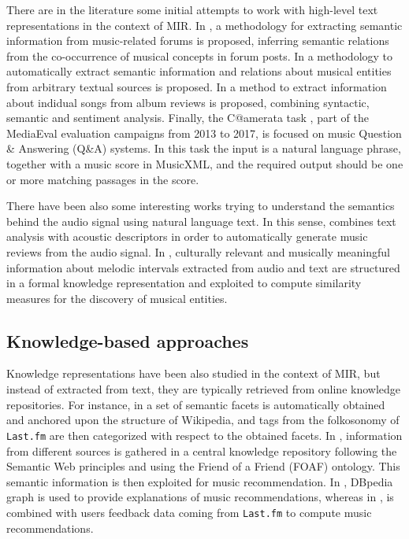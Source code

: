 There are in the literature some initial attempts to work with high-level text representations in the context of MIR. In \cite{Sordo2012}, a methodology for extracting semantic information from music-related forums is proposed, inferring semantic relations from the co-occurrence of musical concepts in forum posts. 
In \cite{Knees2011} a methodology to automatically extract semantic information and relations about musical entities from arbitrary textual sources is proposed. In \cite{TataandDiEugenio2010} a method to extract information about indidual songs from album reviews is proposed, combining syntactic, semantic and sentiment analysis. Finally, the C@amerata task \cite{sutcliffe2016c, sutcliffe2015}, part of the MediaEval evaluation campaigns from 2013 to 2017, is focused on music Question \& Answering (Q\&A) systems. In this task the input is a natural language phrase, together with a music score in MusicXML, and the required output should be one or more matching passages in the score.

There have been also some interesting works trying to understand the semantics behind the audio signal using natural language text. In this sense, \cite{Whitman2004} combines text analysis with acoustic descriptors in order to automatically generate music reviews from the audio signal. In \cite{koduri2014culture}, culturally relevant and musically meaningful information about melodic intervals extracted from audio and text are structured in a formal knowledge representation and exploited to compute similarity measures for the discovery of musical entities.

\subsection{Knowledge-based approaches}
\label{sec:SOA:mir:semantics}

Knowledge representations have been also studied in the context of MIR, but instead of extracted from text, they are typically retrieved from online knowledge repositories. For instance, in \cite{Sordo2013} a set of semantic facets is automatically obtained and anchored upon the structure of Wikipedia, and tags from the folkosonomy of \texttt{Last.fm} are then categorized with respect to the obtained facets. In \cite{Celma:ISWC06}, information from different sources is gathered in a central knowledge repository following the Semantic Web principles and using the Friend of a Friend (FOAF) ontology. This semantic information is then exploited for music recommendation. In \cite{dbrec1}, DBpedia graph is used to provide explanations of music recommendations, whereas in \cite{Ostuni2013}, is combined with users feedback data coming from \texttt{Last.fm} to compute music recommendations.


